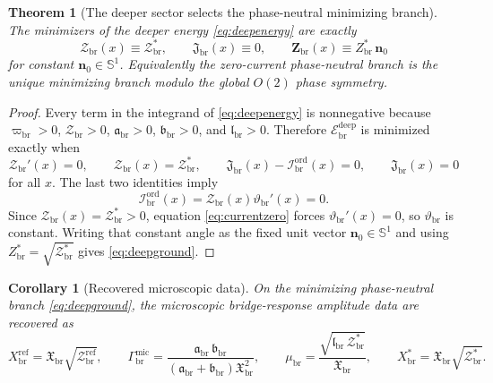 \documentclass[11pt]{article}
\newcommand{\ProfWeight}{\varpi_{\mathrm{br}}}
\newcommand{\RespMicroEq}{X_{\mathrm{br}}^{\ast}}
\newcommand{\RespMicroRef}{X_{\mathrm{br}}^{\mathrm{ref}}}
\newcommand{\RespMicroFluxCoeff}{\Gamma_{\mathrm{br}}^{\mathrm{mic}}}
\newcommand{\RespMicroGap}{\mu_{\mathrm{br}}}
\newcommand{\RespOrderField}{\bm Z_{\mathrm{br}}}
\newcommand{\RespOrderEq}{Z_{\mathrm{br}}^{\ast}}
\newcommand{\RespOrderCurrent}{\mathcal I_{\mathrm{br}}^{\mathrm{ord}}}
\newcommand{\RespOrderPhase}{\vartheta_{\mathrm{br}}}
\newcommand{\RespOrderDir}{\bm n_0}
\newcommand{\RespDeepDensity}{\mathcal Z_{\mathrm{br}}}
\newcommand{\RespDeepDensityRef}{\mathcal Z_{\mathrm{br}}^{\mathrm{ref}}}
\newcommand{\RespDeepDensityEq}{\mathcal Z_{\mathrm{br}}^{\ast}}
\newcommand{\RespDeepReadout}{\mathfrak X_{\mathrm{br}}}
\newcommand{\RespDeepTrack}{\mathfrak a_{\mathrm{br}}}
\newcommand{\RespDeepRelax}{\mathfrak b_{\mathrm{br}}}
\newcommand{\RespDeepWell}{\mathfrak l_{\mathrm{br}}}
\newcommand{\RespDeepAux}{\mathfrak J_{\mathrm{br}}}
\newcommand{\RespDeepEnergy}{\mathscr E_{\mathrm{br}}^{\mathrm{deep}}}
\newtheorem{corollary}{Corollary}
\newtheorem{theorem}{Theorem}
\begin{document}
\begin{theorem}[The deeper sector selects the phase-neutral minimizing branch]
\label{thm:neutralselection}
The minimizers of the deeper energy \eqref{eq:deepenergy} are exactly
\begin{equation}
\RespDeepDensity(x)\equiv \RespDeepDensityEq,
\qquad
\RespDeepAux(x)\equiv0,
\qquad
\RespOrderField(x)\equiv \RespOrderEq\,\RespOrderDir
\label{eq:deepground}
\end{equation}
for constant \(\RespOrderDir\in\mathbb S^1\). Equivalently the zero-current phase-neutral branch is the unique minimizing branch modulo the global \(O(2)\) phase symmetry.
\end{theorem}

\begin{proof}
Every term in the integrand of \eqref{eq:deepenergy} is nonnegative because \(\ProfWeight>0\), \(\RespDeepDensity>0\), \(\RespDeepTrack>0\), \(\RespDeepRelax>0\), and \(\RespDeepWell>0\). Therefore \(\RespDeepEnergy\) is minimized exactly when
\begin{equation}
\RespDeepDensity'(x)=0,
\qquad
\RespDeepDensity(x)=\RespDeepDensityEq,
\qquad
\RespDeepAux(x)-\RespOrderCurrent(x)=0,
\qquad
\RespDeepAux(x)=0
\label{eq:minconditions}
\end{equation}
for all \(x\). The last two identities imply
\begin{equation}
\RespOrderCurrent(x)=\RespDeepDensity(x)\RespOrderPhase'(x)=0.
\label{eq:currentzero}
\end{equation}
Since \(\RespDeepDensity(x)=\RespDeepDensityEq>0\), equation \eqref{eq:currentzero} forces \(\RespOrderPhase'(x)=0\), so \(\RespOrderPhase\) is constant. Writing that constant angle as the fixed unit vector \(\RespOrderDir\in\mathbb S^1\) and using \(\RespOrderEq=\sqrt{\RespDeepDensityEq}\) gives \eqref{eq:deepground}.
\end{proof}

\begin{corollary}[Recovered microscopic data]
\label{cor:microdata}
On the minimizing phase-neutral branch \eqref{eq:deepground}, the microscopic bridge-response amplitude data are recovered as
\begin{equation}
\RespMicroRef=\RespDeepReadout\sqrt{\RespDeepDensityRef},
\qquad
\RespMicroFluxCoeff=\frac{\RespDeepTrack\,\RespDeepRelax}{(\RespDeepTrack+\RespDeepRelax)\RespDeepReadout^2},
\qquad
\RespMicroGap=\frac{\sqrt{\RespDeepWell\,\RespDeepDensityEq}}{\RespDeepReadout},
\qquad
\RespMicroEq=\RespDeepReadout\sqrt{\RespDeepDensityEq}.
\label{eq:microfromdeep}
\end{equation}
\end{corollary}
\end{document}
